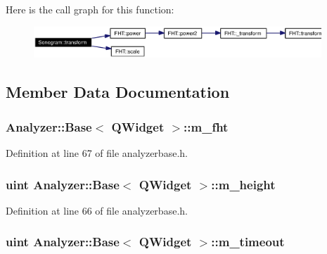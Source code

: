 Here is the call graph for this function:\begin{figure}[H]
\begin{center}
\leavevmode
\includegraphics[width=307pt]{classSonogram_Sonograma4_cgraph}
\end{center}
\end{figure}


\subsection{Member Data Documentation}
\subsubsection{ {\bf Analyzer::Base}$<$ {\bf QWidget}  $>$::{\bf m\_\-fht}\hspace{0.3cm}{\tt  [protected, inherited]}}\label{classAnalyzer_1_1Base_Analyzer_1_1Basep3}




Definition at line 67 of file analyzerbase.h.
\subsubsection{\setlength{\rightskip}{0pt plus 5cm}uint {\bf Analyzer::Base}$<$ {\bf QWidget}  $>$::{\bf m\_\-height}\hspace{0.3cm}{\tt  [protected, inherited]}}\label{classAnalyzer_1_1Base_Analyzer_1_1Basep2}




Definition at line 66 of file analyzerbase.h.
\subsubsection{\setlength{\rightskip}{0pt plus 5cm}uint {\bf Analyzer::Base}$<$ {\bf QWidget}  $>$::{\bf m\_\-timeout}\hspace{0.3cm}{\tt  [protected, inherited]}}\label{classAnalyzer_1_1Base_Analyzer_1_1Basep1}




